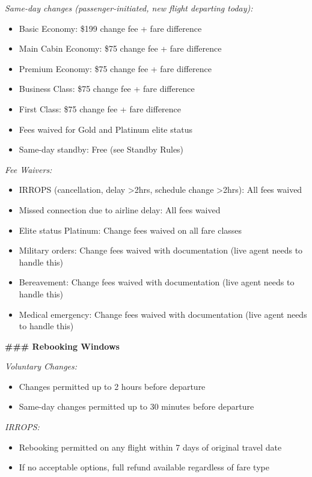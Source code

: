 \begin{tcolorbox}[promptbox, title={\small \texttt{Airline CSM Agent Prompt}}]
\medskip
\textit{Same-day changes (passenger-initiated, new flight departing today):}
\begin{itemize}
  \item Basic Economy: \$199 change fee + fare difference
  \item Main Cabin Economy: \$75 change fee + fare difference
  \item Premium Economy: \$75 change fee + fare difference
  \item Business Class: \$75 change fee + fare difference
  \item First Class: \$75 change fee + fare difference
  \item Fees waived for Gold and Platinum elite status
  \item Same-day standby: Free (see Standby Rules)
\end{itemize}
 
\medskip
\textit{Fee Waivers:}
\begin{itemize}
  \item IRROPS (cancellation, delay \textgreater2hrs, schedule change \textgreater2hrs):
        All fees waived
  \item Missed connection due to airline delay: All fees waived
  \item Elite status Platinum: Change fees waived on all fare classes
  \item Military orders: Change fees waived with documentation (live agent needs to handle
        this)
  \item Bereavement: Change fees waived with documentation (live agent needs to handle this)
  \item Medical emergency: Change fees waived with documentation (live agent needs to handle
        this)
\end{itemize}
 
\bigskip
\textbf{\#\#\# Rebooking Windows}
 
\medskip
\textit{Voluntary Changes:}
\begin{itemize}
  \item Changes permitted up to 2 hours before departure
  \item Same-day changes permitted up to 30 minutes before departure
\end{itemize}
 
\medskip
\textit{IRROPS:}
\begin{itemize}
  \item Rebooking permitted on any flight within 7 days of original travel date
  \item If no acceptable options, full refund available regardless of fare type
\end{itemize}
 

\end{tcolorbox}
